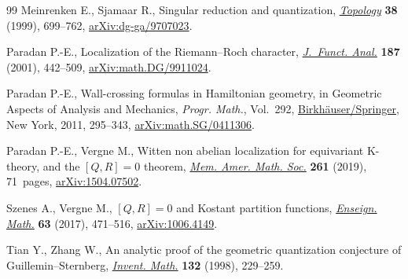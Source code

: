 \documentclass[pdftex]{sigma}
\numberwithin{equation}{section}
\begin{document}
\begin{thebibliography}{99}
Meinrenken E., Sjamaar R., Singular reduction and quantization,
 \href{https://doi.org/10.1016/S0040-9383(98)00012-3}{\textit{Topology}} \textbf{38} (1999), 699--762, \href{https://arxiv.org/abs/dg-ga/9707023}{arXiv:dg-ga/9707023}.

Paradan P.-E., Localization of the {R}iemann--{R}och character,
 \href{https://doi.org/10.1006/jfan.2001.3825}{\textit{J.~Funct. Anal.}} \textbf{187} (2001), 442--509,
 \href{https://arxiv.org/abs/math.DG/9911024}{arXiv:math.DG/9911024}.

Paradan P.-E., Wall-crossing formulas in {H}amiltonian geometry, in Geometric
 Aspects of Analysis and Mechanics, \textit{Progr. Math.}, Vol.~292,
 \href{https://doi.org/10.1007/978-0-8176-8244-6_11}{Birkh\"{a}user/Springer}, New York, 2011, 295--343, \href{https://arxiv.org/abs/math.SG/0411306}{arXiv:math.SG/0411306}.

Paradan P.-E., Vergne M., Witten non abelian localization for equivariant
 {K}-theory, and the {$[Q,R]=0$} theorem, \href{https://doi.org/10.1090/memo/1257}{\textit{Mem. Amer. Math. Soc.}}
 \textbf{261} (2019), 71~pages, \href{https://arxiv.org/abs/1504.07502}{arXiv:1504.07502}.

Szenes A., Vergne M., {$[Q,R]=0$} and {K}ostant partition functions,
 \href{https://doi.org/10.4171/LEM/63-3/4-8}{\textit{Enseign. Math.}} \textbf{63} (2017), 471--516, \href{https://arxiv.org/abs/1006.4149}{arXiv:1006.4149}.

Tian Y., Zhang W., An analytic proof of the geometric quantization conjecture
 of {G}uillemin--{S}ternberg, \href{https://doi.org/10.1007/s002220050223}{\textit{Invent. Math.}} \textbf{132} (1998),
 229--259.

\end{thebibliography}\LastPageEnding
\end{document}
